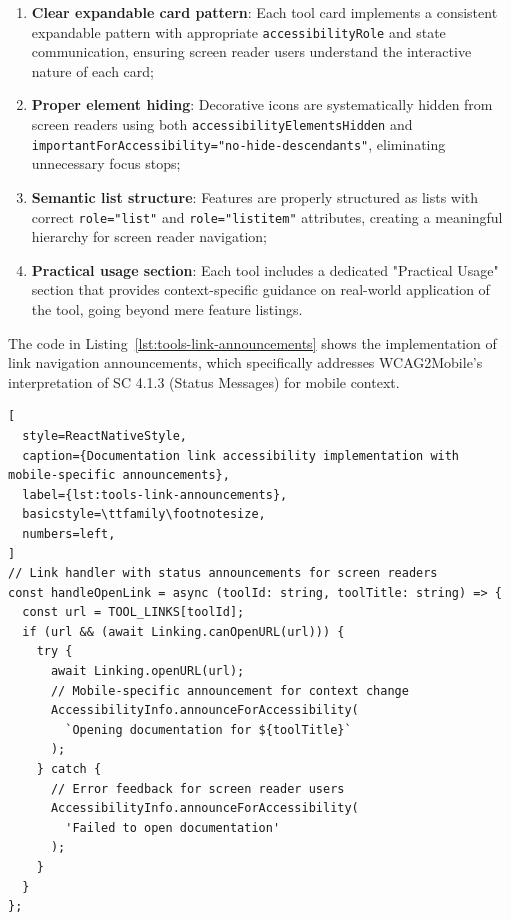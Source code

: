 \begin{enumerate}
    \item \textbf{Clear expandable card pattern}: Each tool card implements a consistent expandable pattern with appropriate \texttt{accessibilityRole} and state communication, ensuring screen reader users understand the interactive nature of each card;
    
    \item \textbf{Proper element hiding}: Decorative icons are systematically hidden from screen readers using both \texttt{accessibilityElementsHidden} and \\\texttt{importantForAccessibility="no-hide-descendants"}, eliminating unnecessary focus stops;
    
    \item \textbf{Semantic list structure}: Features are properly structured as lists with correct \texttt{role="list"} and \texttt{role="listitem"} attributes, creating a meaningful hierarchy for screen reader navigation;
    
    \item \textbf{Practical usage section}: Each tool includes a dedicated "Practical Usage" section that provides context-specific guidance on real-world application of the tool, going beyond mere feature listings.
\end{enumerate}

The code in Listing~\ref{lst:tools-link-announcements} shows the implementation of link navigation announcements, which specifically addresses WCAG2Mobile's interpretation of SC 4.1.3 (Status Messages) for mobile context.

\begin{lstlisting}[
  style=ReactNativeStyle,
  caption={Documentation link accessibility implementation with mobile-specific announcements},
  label={lst:tools-link-announcements},
  basicstyle=\ttfamily\footnotesize,
  numbers=left,
]
// Link handler with status announcements for screen readers
const handleOpenLink = async (toolId: string, toolTitle: string) => {
  const url = TOOL_LINKS[toolId];
  if (url && (await Linking.canOpenURL(url))) {
    try {
      await Linking.openURL(url);
      // Mobile-specific announcement for context change
      AccessibilityInfo.announceForAccessibility(
        `Opening documentation for ${toolTitle}`
      );
    } catch {
      // Error feedback for screen reader users
      AccessibilityInfo.announceForAccessibility(
        'Failed to open documentation'
      );
    }
  }
};
\end{lstlisting}
\FloatBarrier


